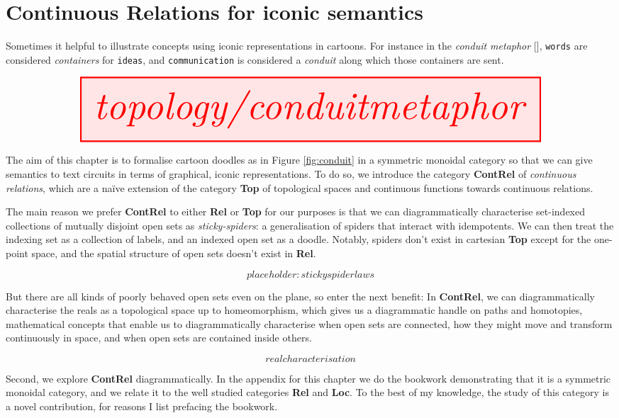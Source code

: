\section{Continuous Relations for iconic semantics}

Sometimes it helpful to illustrate concepts using iconic representations in cartoons. For instance in the \emph{conduit metaphor} [], \texttt{words} are considered \emph{containers} for \texttt{ideas}, and \texttt{communication} is considered a \emph{conduit} along which those containers are sent.

\[\resizebox{1.5\textwidth}{!}{\tikzfig{topology/conduitmetaphor}}\]

The aim of this chapter is to formalise cartoon doodles as in Figure \ref{fig:conduit} in a symmetric monoidal category so that we can give semantics to text circuits in terms of graphical, iconic representations. To do so, we introduce the category \textbf{ContRel} of \emph{continuous relations}, which are a na\"{i}ve extension of the category \textbf{Top} of topological spaces and continuous functions towards continuous relations.

The main reason we prefer \textbf{ContRel} to either \textbf{Rel} or \textbf{Top} for our purposes is that we can diagrammatically characterise set-indexed collections of mutually disjoint open sets as \emph{sticky-spiders}: a generalisation of spiders that interact with idempotents. We can then treat the indexing set as a collection of labels, and an indexed open set as a doodle. Notably, spiders don't exist in cartesian \textbf{Top} except for the one-point space, and the spatial structure of open sets doesn't exist in \textbf{Rel}.

\[placeholder: stickyspider laws\]

But there are all kinds of poorly behaved open sets even on the plane, so enter the next benefit: In \textbf{ContRel}, we can diagrammatically characterise the reals as a topological space up to homeomorphism, which gives us a diagrammatic handle on paths and homotopies, mathematical concepts that enable us to diagrammatically characterise when open sets are connected, how they might move and transform continuously in space, and when open sets are contained inside others.

\[real characterisation\]

\newpage

Second, we explore \textbf{ContRel} diagrammatically. In the appendix for this chapter we do the bookwork demonstrating that it is a symmetric monoidal category, and we relate it to the well studied categories \textbf{Rel} and \textbf{Loc}. To the best of my knowledge, the study of this category is a novel contribution, for reasons I list prefacing the bookwork.\\

